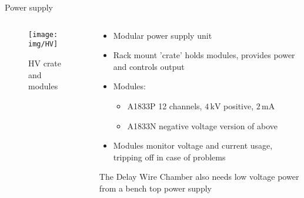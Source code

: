 \documentclass[9pt]{beamer}
\begin{document}
\begin{frame}{Power supply}
  \begin{columns}
    \begin{column}{.6\textwidth}
    \vspace*{-0.5cm}
    \begin{figure}\texttt{[image: img/HV]}\vspace*{-0.2cm}\caption{HV crate and modules}\end{figure}\vspace*{-1cm}
    \end{column}
    \begin{column}{.4\textwidth}
    \vspace*{-0.5cm}
    \begin{itemize}
        \item Modular power supply unit
        \item Rack mount 'crate' holds modules, provides power and controls output
        \item Modules:
        \begin{itemize}
            \item A1833P 12 channels, $4\,\mathrm{kV}$ positive, $2\,\mathrm{mA}$
            \item A1833N negative voltage version of above
        \end{itemize}
        \item Modules monitor voltage and current usage, tripping off in case of problems
    \end{itemize}
        The Delay Wire Chamber also needs low voltage power from a bench top power supply
    \end{column}
  \end{columns}
\end{frame}
\end{document}

